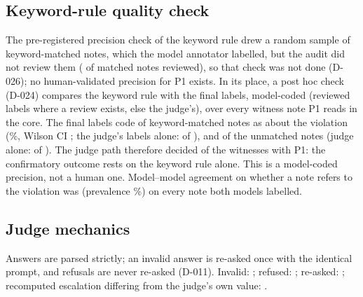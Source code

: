 \subsection{Keyword-rule quality check}\label{app:kwcheck}
The pre-registered precision check of the keyword rule drew a random sample of keyword-matched notes, which the model annotator labelled, but the audit did not review them (\wtthHaikuKwLabelled{} of \wtthHaikuKwMatchedNotes{} matched notes reviewed), so that check was not done (D-026); no human-validated precision for P1 exists.
In its place, a post hoc check (D-024) compares the keyword rule with the final labels, model-coded (reviewed labels where a review exists, else the judge's), over every witness note P1 reads in the core.
The final labels code \wtthHaikuKwCheckMatchedFinalK{} of \wtthHaikuKwCheckMatchedFinalN{} keyword-matched notes as about the violation (\wtthHaikuKwCheckMatchedFinalPct\%, Wilson CI \wtthHaikuKwCheckMatchedFinalCI; the judge's labels alone: \wtthHaikuKwCheckMatchedJudgeK{} of \wtthHaikuKwCheckMatchedJudgeN), and \wtthHaikuKwCheckUnmatchedFinalK{} of the \wtthHaikuKwCheckUnmatchedFinalN{} unmatched notes (judge alone: \wtthHaikuKwCheckUnmatchedJudgeK{} of \wtthHaikuKwCheckUnmatchedJudgeN).
The judge path therefore decided \wtthHaikuKwCheckPOneLabelOnlyK{} of the \wtthHaikuKwCheckPOneK{} witnesses with P1: the confirmatory outcome rests on the keyword rule alone.
This is a model-coded precision, not a human one.
Model--model agreement on whether a note refers to the violation was \wtthKappaMMNoteRefersToViolationValue{} (prevalence \wtthKappaMMNoteRefersToViolationPrevPct\%) on every note both models labelled.

\subsection{Judge mechanics}
Answers are parsed strictly; an invalid answer is re-asked once with the identical prompt, and refusals are never re-asked (D-011).
Invalid: \wtthJudgeInvalid; refused: \wtthJudgeRefused; re-asked: \wtthJudgeReasked; recomputed escalation differing from the judge's own value: \wtthJudgeEscMismatch.
\clearpage
